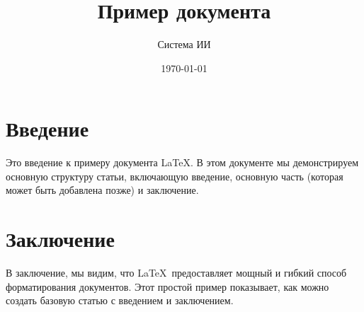 \documentclass{article}
\title{Пример документа}
\author{Система ИИ}
\date{\today}
\begin{document}
\maketitle

\section{Введение}
Это введение к примеру документа \LaTeX. В этом документе мы демонстрируем основную структуру статьи, включающую введение, основную часть (которая может быть добавлена позже) и заключение.

\section{Заключение}
В заключение, мы видим, что \LaTeX\ предоставляет мощный и гибкий способ форматирования документов. Этот простой пример показывает, как можно создать базовую статью с введением и заключением.
\end{document}
